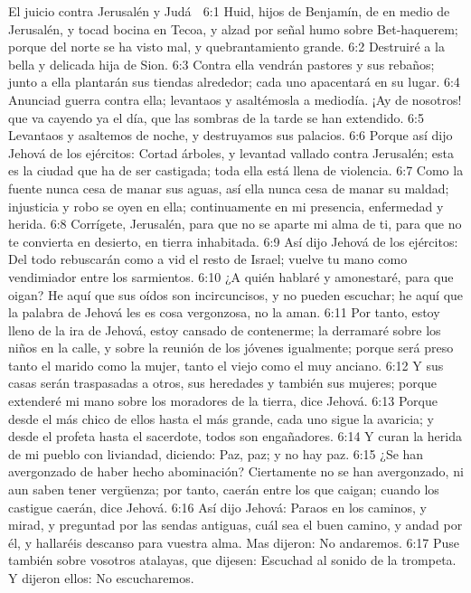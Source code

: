 El juicio contra Jerusalén y Judá  

6:1 Huid, hijos de Benjamín, de en medio de Jerusalén, y tocad bocina en Tecoa, y alzad por señal humo sobre Bet-haquerem; porque del norte se ha visto mal, y quebrantamiento grande.  
6:2 Destruiré a la bella y delicada hija de Sion.  
6:3 Contra ella vendrán pastores y sus rebaños; junto a ella plantarán sus tiendas alrededor; cada uno apacentará en su lugar.  
6:4 Anunciad guerra contra ella; levantaos y asaltémosla a mediodía. ¡Ay de nosotros! que va cayendo ya el día, que las sombras de la tarde se han extendido.  
6:5 Levantaos y asaltemos de noche, y destruyamos sus palacios.  
6:6 Porque así dijo Jehová de los ejércitos: Cortad árboles, y levantad vallado contra Jerusalén; esta es la ciudad que ha de ser castigada; toda ella está llena de violencia.  
6:7 Como la fuente nunca cesa de manar sus aguas, así ella nunca cesa de manar su maldad; injusticia y robo se oyen en ella; continuamente en mi presencia, enfermedad y herida.  
6:8 Corrígete, Jerusalén, para que no se aparte mi alma de ti, para que no te convierta en desierto, en tierra inhabitada.  
6:9 Así dijo Jehová de los ejércitos: Del todo rebuscarán como a vid el resto de Israel; vuelve tu mano como vendimiador entre los sarmientos.  
6:10 ¿A quién hablaré y amonestaré, para que oigan? He aquí que sus oídos son incircuncisos, y no pueden escuchar; he aquí que la palabra de Jehová les es cosa vergonzosa, no la aman.  
6:11 Por tanto, estoy lleno de la ira de Jehová, estoy cansado de contenerme; la derramaré sobre los niños en la calle, y sobre la reunión de los jóvenes igualmente; porque será preso tanto el marido como la mujer, tanto el viejo como el muy anciano.  
6:12 Y sus casas serán traspasadas a otros, sus heredades y también sus mujeres; porque extenderé mi mano sobre los moradores de la tierra, dice Jehová.  
6:13 Porque desde el más chico de ellos hasta el más grande, cada uno sigue la avaricia; y desde el profeta hasta el sacerdote, todos son engañadores.  
6:14 Y curan la herida de mi pueblo con liviandad, diciendo: Paz, paz; y no hay paz. 
6:15 ¿Se han avergonzado de haber hecho abominación? Ciertamente no se han avergonzado, ni aun saben tener vergüenza; por tanto, caerán entre los que caigan; cuando los castigue caerán, dice Jehová. 
6:16 Así dijo Jehová: Paraos en los caminos, y mirad, y preguntad por las sendas antiguas, cuál sea el buen camino, y andad por él, y hallaréis descanso para vuestra alma. Mas dijeron: No andaremos.  
6:17 Puse también sobre vosotros atalayas, que dijesen: Escuchad al sonido de la trompeta. Y dijeron ellos: No escucharemos.  
